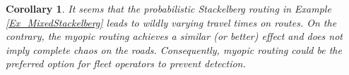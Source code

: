 \documentclass[a4paper,11pt]{article}
\newtheorem{example}[theorem]{Example}
\newtheorem{corollary}[theorem]{Corollary}
\begin{document}







\begin{corollary}
It seems that the probabilistic Stackelberg routing in Example \ref{Ex_MixedStackelberg} leads to wildly varying travel times on routes. On the contrary, the myopic routing achieves a similar (or better) effect and does not imply complete chaos on the roads. Consequently, myopic routing could be the preferred option for fleet operators to prevent detection. 
\end{corollary}
\end{document}
